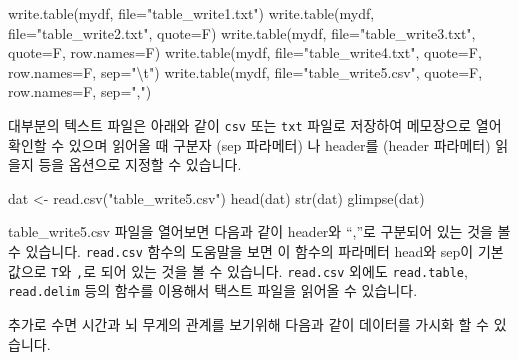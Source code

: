 \documentclass[
  a4paper,
]{book}
\newenvironment{Shaded}{\begin{snugshade}}{\end{snugshade}}
\newcommand{\AttributeTok}[1]{\textcolor[rgb]{0.40,0.45,0.13}{#1}}
\newcommand{\FunctionTok}[1]{\textcolor[rgb]{0.28,0.35,0.67}{#1}}
\newcommand{\NormalTok}[1]{\textcolor[rgb]{0.00,0.23,0.31}{#1}}
\newcommand{\OtherTok}[1]{\textcolor[rgb]{0.00,0.23,0.31}{#1}}
\newcommand{\SpecialCharTok}[1]{\textcolor[rgb]{0.37,0.37,0.37}{#1}}
\newcommand{\StringTok}[1]{\textcolor[rgb]{0.13,0.47,0.30}{#1}}
\begin{document}
\begin{Shaded}
\begin{Highlighting}[]
\FunctionTok{write.table}\NormalTok{(mydf, }\AttributeTok{file=}\StringTok{"table\_write1.txt"}\NormalTok{)}
\FunctionTok{write.table}\NormalTok{(mydf, }\AttributeTok{file=}\StringTok{"table\_write2.txt"}\NormalTok{, }\AttributeTok{quote=}\NormalTok{F)}
\FunctionTok{write.table}\NormalTok{(mydf, }\AttributeTok{file=}\StringTok{"table\_write3.txt"}\NormalTok{, }\AttributeTok{quote=}\NormalTok{F, }\AttributeTok{row.names=}\NormalTok{F)}
\FunctionTok{write.table}\NormalTok{(mydf, }\AttributeTok{file=}\StringTok{"table\_write4.txt"}\NormalTok{, }\AttributeTok{quote=}\NormalTok{F, }\AttributeTok{row.names=}\NormalTok{F, }\AttributeTok{sep=}\StringTok{"}\SpecialCharTok{\textbackslash{}t}\StringTok{"}\NormalTok{)}
\FunctionTok{write.table}\NormalTok{(mydf, }\AttributeTok{file=}\StringTok{"table\_write5.csv"}\NormalTok{, }\AttributeTok{quote=}\NormalTok{F, }\AttributeTok{row.names=}\NormalTok{F, }\AttributeTok{sep=}\StringTok{","}\NormalTok{)}
\end{Highlighting}
\end{Shaded}

대부분의 텍스트 파일은 아래와 같이 \texttt{csv} 또는 \texttt{txt} 파일로
저장하여 메모장으로 열어 확인할 수 있으며 읽어올 때 구분자 (sep
파라메터) 나 header를 (header 파라메터) 읽을지 등을 옵션으로 지정할 수
있습니다.

\begin{Shaded}
\begin{Highlighting}[]
\NormalTok{dat }\OtherTok{\textless{}{-}} \FunctionTok{read.csv}\NormalTok{(}\StringTok{"table\_write5.csv"}\NormalTok{)}
\FunctionTok{head}\NormalTok{(dat)}
\FunctionTok{str}\NormalTok{(dat)}
\FunctionTok{glimpse}\NormalTok{(dat)}
\end{Highlighting}
\end{Shaded}

table\_write5.csv 파일을 열어보면 다음과 같이 header와 ``,''로 구분되어
있는 것을 볼 수 있습니다. \texttt{read.csv} 함수의 도움말을 보면 이
함수의 파라메터 head와 sep이 기본값으로 \texttt{T}와 \texttt{,}로 되어
있는 것을 볼 수 있습니다. \texttt{read.csv} 외에도 \texttt{read.table},
\texttt{read.delim} 등의 함수를 이용해서 택스트 파일을 읽어올 수
있습니다.

추가로 수면 시간과 뇌 무게의 관계를 보기위해 다음과 같이 데이터를 가시화
할 수 있습니다.

\begin{Shaded}
\end{Shaded}
\end{document}
